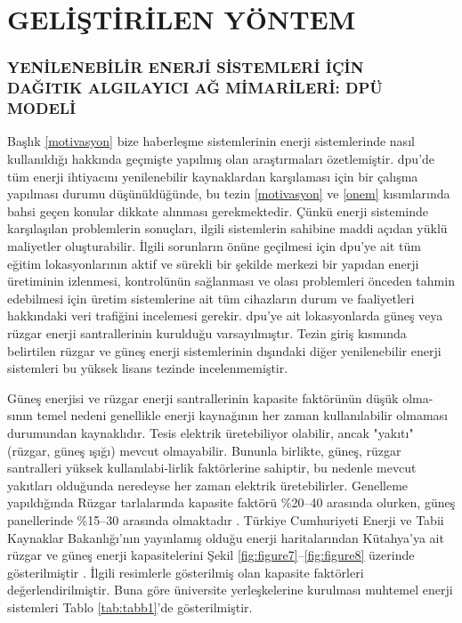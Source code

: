 \part{GELİŞTİRİLEN YÖNTEM}
\thispagestyle{empty}
\newpage
\section{YENİLENEBİLİR ENERJİ SİSTEMLERİ İÇİN\\DAĞITIK ALGILAYICI AĞ MİMARİLERİ: DPÜ MODELİ}

 Başlık \ref{motivasyon} bize haberleşme sistemlerinin enerji sistemlerinde nasıl kullanıldığı hakkında geçmişte yapılmış olan araştırmaları özetlemiştir. \gls{dpu}'de tüm enerji ihtiyacını yenilenebilir kaynaklardan karşılaması için bir çalışma yapılması durumu düşünüldüğünde, bu tezin \ref{motivasyon} ve \ref{onem} kısımlarında bahsi geçen konular dikkate alınması gerekmektedir. Çünkü enerji sisteminde karşılaşılan problemlerin sonuçları, ilgili sistemlerin sahibine maddi açıdan yüklü maliyetler oluşturabilir. İlgili sorunların önüne geçilmesi için \gls{dpu}’ye ait tüm eğitim lokasyonlarının aktif ve sürekli bir şekilde merkezi bir yapıdan enerji üretiminin izlenmesi, kontrolünün sağlanması ve olası problemleri önceden tahmin edebilmesi için üretim sistemlerine ait tüm cihazların durum ve faaliyetleri hakkındaki veri trafiğini incelemesi gerekir. \gls{dpu}’ye ait lokasyonlarda güneş veya rüzgar enerji santrallerinin kurulduğu varsayılmıştır. Tezin giriş kısmında belirtilen rüzgar ve güneş enerji sistemlerinin dışındaki diğer yenilenebilir enerji sistemleri bu yüksek lisans tezinde incelenmemiştir.

Güneş enerjisi ve rüzgar enerji santrallerinin kapasite faktörünün düşük olma-sının temel nedeni genellikle enerji kaynağının her zaman kullanılabilir olmaması durumundan kaynaklıdır. Tesis elektrik üretebiliyor olabilir, ancak "yakıtı" (rüzgar, güneş ışığı) mevcut olmayabilir. Bununla birlikte, güneş, rüzgar santralleri yüksek kullanılabi-lirlik faktörlerine sahiptir, bu nedenle mevcut yakıtları olduğunda neredeyse her zaman elektrik üretebilirler. Genelleme yapıldığında Rüzgar tarlalarında kapasite faktörü \%20--40 arasında olurken, güneş panellerinde \%15--30 arasında olmaktadır \cite{hussain2014multilayer}. Türkiye Cumhuriyeti Enerji ve Tabii Kaynaklar Bakanlığı’nın yayınlamış olduğu enerji haritalarından Kütahya’ya ait rüzgar ve güneş enerji kapasitelerini Şekil \ref{fig:figure7}--\ref{fig:figure8} üzerinde gösterilmiştir \cite{gepa}\cite{repa}. İlgili resimlerle gösterilmiş olan kapasite faktörleri değerlendirilmiştir. Buna göre üniversite yerleşkelerine kurulması muhtemel enerji sistemleri Tablo \ref{tab:tabb1}'de gösterilmiştir.

